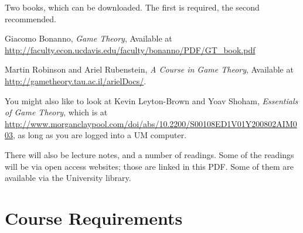 \documentclass[10pt]{article}
\begin{document}
Two books, which can be downloaded. The first is required, the second recommended.

\begin{itemize*}
\item Giacomo Bonanno, \textit{Game Theory}, Available at \\ \url{http://faculty.econ.ucdavis.edu/faculty/bonanno/PDF/GT_book.pdf}
\item Martin Robinson and Ariel Rubenstein, \textit{A Course in Game Theory}, Available at \\ \url{http://gametheory.tau.ac.il/arielDocs/}.
\end{itemize*}

You might also like to look at Kevin Leyton-Brown and Yoav Shoham, \textit{Essentials of Game Theory}, which is  at \url{http://www.morganclaypool.com/doi/abs/10.2200/S00108ED1V01Y200802AIM003}, as long as you are logged into a UM computer. \smallskip

There will also be lecture notes, and a number of readings. Some of the readings will be via open access websites; those are linked in this PDF. Some of them are available via the University library. 

\newpage

%
%

\section*{Course Requirements}
\end{document}
